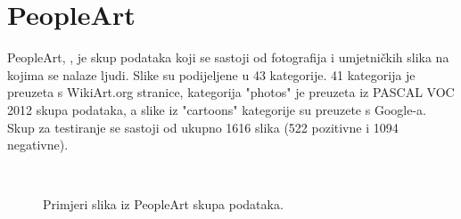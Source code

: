 \section{PeopleArt}
PeopleArt, \cite{westlake2016detecting}, je skup podataka koji se sastoji od fotografija i umjetničkih slika na kojima se nalaze ljudi. Slike su podijeljene u 43 kategorije. 41 kategorija je preuzeta s WikiArt.org stranice, kategorija "photos" je preuzeta iz PASCAL VOC 2012 skupa podataka, a slike iz "cartoons" kategorije su preuzete s Google-a.
Skup za testiranje se sastoji od ukupno 1616 slika (522 pozitivne i 1094 negativne).

\begin{figure}[h]
 \
 \
 \
\caption{Primjeri slika iz PeopleArt skupa podataka.}
\end{figure}

